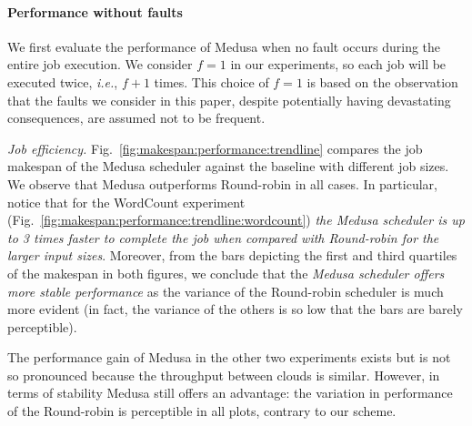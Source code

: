 \documentclass[10pt, conference, compsocconf]{IEEEtran}
\begin{document}
\paragraph{Performance without faults}
We first evaluate the performance of Medusa when no fault occurs during the entire job execution.
We consider $f=1$ in our experiments, so each job will be executed twice, \textit{i.e.}, $f+1$ times.
This choice of $f=1$ is based on the observation that the faults we consider in this paper, despite potentially having devastating consequences, are assumed not to be frequent.

\textit{Job efficiency.} Fig.~\ref{fig:makespan:performance:trendline} compares the job makespan of the Medusa scheduler against the baseline with different job sizes.
We observe that Medusa outperforms Round-robin in all cases.
In particular, notice that for the WordCount experiment (Fig.~\ref{fig:makespan:performance:trendline:wordcount}) \emph{the Medusa scheduler is up to 3 times faster to complete the job when compared with Round-robin for the larger input sizes}.
Moreover, from the  bars depicting the first and third quartiles of the makespan in both figures, we conclude that the \emph{Medusa scheduler offers more stable performance} as the variance of the Round-robin scheduler is much more evident (in fact, the variance of the others is so low that the  bars are barely perceptible).

The performance gain of Medusa in the other two experiments exists but is not so pronounced because the throughput between clouds is similar.
However, in terms of stability Medusa still offers an advantage: the variation in performance of the Round-robin is perceptible in all plots, contrary to our scheme.
\end{document}
